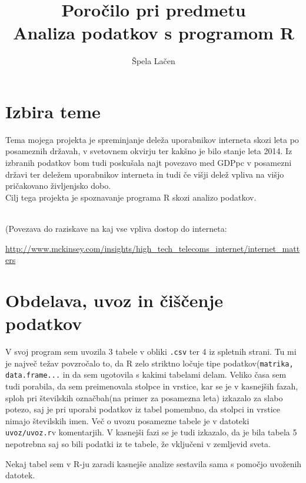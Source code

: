 \documentclass[11pt,a4paper]{article}
\begin{document}
\author{Špela Lačen}
\title{Poročilo pri predmetu \\
Analiza podatkov s programom R}
\maketitle

\section{Izbira teme}

Tema mojega projekta je spreminjanje deleža uporabnikov interneta skozi leta po posameznih državah, v svetovnem okvirju ter kakšno je bilo stanje leta 2014. Iz izbranih podatkov bom tudi poskušala najt povezavo med  GDPpc v posamezni državi ter deležem uporabnikov interneta in tudi če višji delež  vpliva na višjo pričakovano življenjsko dobo.
\\ Cilj tega projekta je spoznavanje programa R skozi analizo podatkov.

\\ (Povezava do raziskave na kaj vse vpliva dostop do interneta: \item \url{http://www.mckinsey.com/insights/high_tech_telecoms_internet/internet_matters}

\section{Obdelava, uvoz in čiščenje podatkov}

V svoj program sem uvozila 3 tabele  v obliki \verb|.csv| ter 4 iz spletnih strani. Tu mi je največ težav povzročalo to, da R zelo striktno ločuje tipe podatkov(\verb|matrika, data.frame...| in da sem ugotovila s kakimi tabelami delam. Veliko časa sem tudi porabila, da sem preimenovala stolpce in vrstice, kar se je v kasnejših fazah, sploh pri številskih označbah(na primer za posamezna leta) izkazalo za slabo potezo, saj je pri uporabi podatkov iz tabel pomembno, da stolpci in vrstice nimajo številskih imen. Več o uvozu posamezne tabele je v datoteki \verb|uvoz/uvoz.r|v komentarjih. V kasnejši fazi se je tudi izkazalo, da je bila tabela 5 nepotrebna saj so bili podatki iz te tabele, že vključeni v zemljevid sveta.

Nekaj tabel sem v R-ju zaradi kasnejše analize sestavila sama s pomočjo uvoženih datotek.
\end{document}
